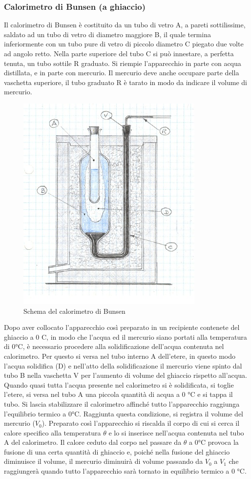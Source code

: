 \documentclass[
10pt, %
a4paper, %
oneside, %
headinclude,footinclude, %
BCOR5mm, %
]{scrartcl}
\begin{document}
\subsubsection*{Calorimetro di Bunsen (a ghiaccio)}
Il calorimetro di Bunsen è costituito da un tubo di vetro A, a pareti sottilissime, saldato ad un tubo di vetro di diametro maggiore B, il quale termina inferiormente con un tubo pure di vetro di piccolo diametro C piegato due volte ad angolo retto. Nella parte superiore del tubo C si può innestare, a perfetta tenuta, un tubo sottile R graduato. Si riempie l'apparecchio in parte con acqua distillata, e in parte con mercurio. Il mercurio deve anche occupare parte della vaschetta superiore, il tubo graduato R è tarato in modo da indicare il volume di mercurio.
\begin{figure}[h!]
	\centering
	\includegraphics[width=0.5\linewidth]{../images/calorimetro_bunsen}
	\caption{Schema del calorimetro di Bunsen}
	\label{fig:calorimetrobunsen}
\end{figure}
\FloatBarrier
Dopo aver collocato l’apparecchio così preparato in un recipiente contenete del ghiaccio a 0 \textdegree C, in modo che l’acqua ed il mercurio siano portati alla temperatura di 0°C, è necessario procedere alla solidificazione dell’acqua contenuta nel calorimetro. Per questo si versa nel tubo interno A dell’etere, in questo modo l’acqua solidifica (D) e nell’atto della solidificazione il mercurio viene spinto dal tubo B nella vaschetta V per l’aumento di volume del ghiaccio rispetto all'acqua. Quando quasi tutta l’acqua presente nel calorimetro si è solidificata, si toglie l’etere, si versa nel tubo A una piccola quantità di acqua a 0 °C e si tappa il tubo. Si lascia stabilizzare il calorimetro affinché tutto l’apparecchio raggiunga l’equilibrio termico a 0°C. Raggiunta questa condizione, si registra il volume del mercurio ($V_0$). Preparato così l’apparecchio si riscalda il corpo di cui si cerca il calore specifico alla temperatura $\theta$ e lo si inserisce nell’acqua contenuta nel tubo A del calorimetro. Il calore ceduto dal corpo nel passare da $\theta$ a 0°C provoca la fusione di una certa quantità di ghiaccio e, poiché nella fusione del ghiaccio diminuisce il volume, il mercurio diminuirà di volume passando da $V_0$ a $V_1$ che raggiungerà quando tutto l’apparecchio sarà tornato in equilibrio termico a 0 °C.\\
\end{document}
